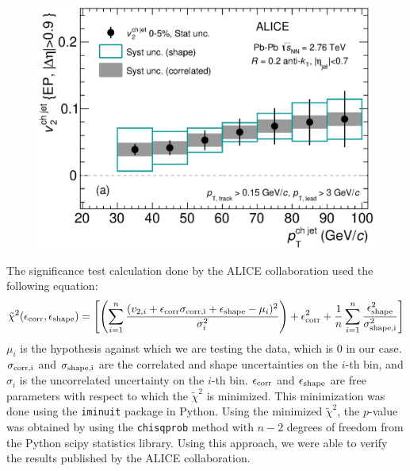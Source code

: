 \documentclass[11pt]{article}
\begin{document}
\begin{center}
    \begin{figure}
        \includegraphics[width=.7\textwidth]{figures/data}
        \label{fig:data}
    \end{figure}
\end{center}

The significance test calculation done by the ALICE collaboration used the following equation:
\begin{equation}\label{eq:chisq_org}
    \tilde{\chi}^2 (\epsilon_{\rm corr}, \epsilon_{\rm shape}) = \left[ \left( \sum_{i=1}^{n} \frac{(v_{2, i} + \epsilon_{\rm corr} \sigma_{\rm corr, i} + \epsilon_{\rm shape} - \mu_i)^2}{\sigma^2_i} \right)+ \epsilon_{\rm corr}^2 +  \frac{1}{n}\sum_{i=1}^{n} \frac{\epsilon_{\rm shape}^2}{\sigma^2_{\rm shape, i}}   \right]
\end{equation}
$\mu_i$ is the hypothesis against which we are testing the data, which is 0 in our case. $\sigma_{\rm corr, i}$ and $\sigma_{\rm shape, i}$ are the correlated and shape uncertainties on the $i$-th bin, and $\sigma_i$ is the uncorrelated uncertainty on the $i$-th bin. $\epsilon_{\rm corr}$ and $\epsilon_{\rm shape}$ are free parameters with respect to which the $\tilde{\chi}^2$ is minimized. This minimization was done using the \texttt{iminuit} package in Python. Using the minimized $\tilde{\chi}^2$, the $p$-value was obtained by using the \texttt{chisqprob} method with $n - 2$ degrees of freedom from the Python scipy statistics library. Using this approach, we were able to verify the results published by the ALICE collaboration.
\end{document}
